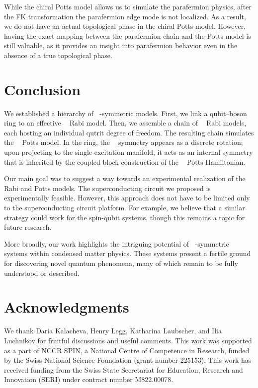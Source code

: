 \documentclass[reprint, aps, prx, amsmath, amssymb, longbibliography, superscriptaddress]{revtex4-2}
\DeclareMathOperator{\Zn}{\mathbb{Z}_n}
\DeclareMathOperator{\Zthree}{\mathbb{Z}_3}
\begin{document}
While the chiral Potts model allows us to simulate the parafermion physics, after the FK transformation the parafermion edge mode is not localized. As a result, we do not have an actual topological phase in the chiral Potts model. However, having the exact mapping between the parafermion chain and the Potts model is still valuable, as it provides an insight into parafermion behavior even in the absence of a true topological phase.



\section{Conclusion}
\label{sec:conclusion}
We established a hierarchy of $\Zthree$-symmetric models. First, we link a qubit–boson ring to an effective $\Zthree$ Rabi model. Then, we assemble a chain of $\Zthree$ Rabi models, each hosting an individual qutrit degree of freedom. The resulting chain simulates the $\Zthree$ Potts model. In the ring, the $\Zthree$ symmetry appears as a discrete rotation; upon projecting to the single-excitation manifold, it acts as an internal symmetry that is inherited by the coupled-block construction of the $\Zthree$ Potts Hamiltonian.

Our main goal was to suggest a way towards an experimental realization of the $\Zthree$ Rabi and Potts models. The superconducting circuit we proposed is experimentally feasible. However, this approach does not have to be limited only to the superconducting circuit platform. For example, we believe that a similar strategy could work for the spin-qubit systems, though this remains a topic for future research.

More broadly, our work highlights the intriguing potential of $\Zn$-symmetric systems within condensed matter physics. These systems present a fertile ground for discovering novel quantum phenomena, many of which remain to be fully understood or described.



\section*{Acknowledgments} 

We thank Daria Kalacheva, Henry Legg, Katharina Laubscher, and Ilia Luchnikov for fruitful discussions and useful comments. This work was supported as a part of NCCR SPIN, a National Centre of Competence in Research, funded by the Swiss National Science Foundation (grant number 225153). This work has received funding from the Swiss State Secretariat for Education, Research and Innovation (SERI) under contract number M822.00078.
\end{document}
